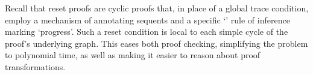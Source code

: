 
Recall that reset proofs are cyclic proofs that, in place of a global trace
  condition, employ a mechanism of annotating sequents and a
specific `\RReset{}' rule of inference marking `progress'. Such a reset condition is local to each simple cycle of the proof's underlying graph. This
eases both proof checking, simplifying the problem to polynomial time,
as well as making it easier to reason about proof transformations.

